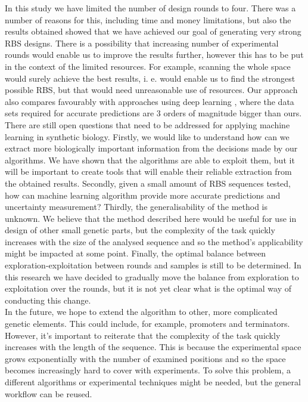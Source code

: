 \documentclass{article}
\begin{document}
In this study we have limited the number of design rounds to four.
There was a number of reasons for this, including time and money limitations, but also the results obtained showed that we have achieved our goal of generating very strong RBS designs.
There is a possibility that increasing number of experimental rounds would enable us to improve the results further, however this has to be put in the context of the limited resources.
For example, scanning the whole space would surely achieve the best results, i. e. would enable us to find the strongest possible RBS, but that would need unreasonable use of resources.
Our approach also compares favourably with approaches using deep learning \cite{Hollerer2020}, where the data sets required for accurate predictions are 3 orders of magnitude bigger than ours. \\

There are still open questions that need to be addressed for applying machine learning in synthetic biology.
Firstly, we would like to understand how can we extract more biologically important information from the decisions made by our algorithms.
We have shown that the algorithms are able to exploit them, but it will be important to create tools that will enable their reliable extraction from the obtained results.
Secondly, given a small amount of RBS sequences tested, how can machine learning algorithm provide more accurate predictions and uncertainty measurement? 
Thirdly, the generalisability of the method is unknown.
We believe that the method described here would be useful for use in design of other small genetic parts, but the complexity of the task quickly increases with the size of the analysed sequence and so the method's applicability might be impacted at some point.
Finally, the optimal balance between exploration-exploitation between rounds and samples is still to be determined.
In this research we have decided to gradually move the balance from exploration to exploitation over the rounds, but it is not yet clear what is the optimal way of conducting this change.\\

In the future, we hope to extend the algorithm to other, more complicated genetic elements.
This could include, for example, promoters and terminators.
However, it's important to reiterate that the complexity of the task quickly increases with the length of the sequence.
This is because the experimental space grows exponentially with the number of examined positions and so the space becomes increasingly hard to cover with experiments.
To solve this problem, a different algorithms or experimental techniques might be needed, but the general workflow can be reused.\\
\end{document}
